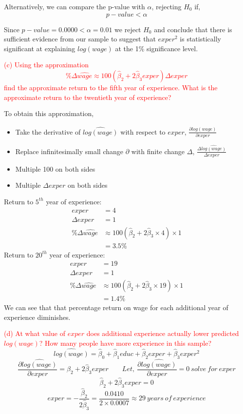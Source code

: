\documentclass[12pt]{report}
\begin{document}
\noindent Alternatively, we can compare the p-value with $\alpha$, rejecting $H_0$ if, $$p-value < \alpha$$

\noindent Since $p-value = 0.0000 < \alpha = 0.01$ we reject $H_0$ and conclude that there is sufficient evidence from our sample to suggest that $exper^2$ is statistically significant at explaining $log(wage)$ at the 1\% significance level.


\newpage
\noindent \textcolor{red}{(c) Using the approximation
	$$\%\Delta\widehat{wage} \approx 100(\hat{\beta}_2 + 2\hat{\beta}_3exper){\Delta}exper$$
	find the approximate return to the fifth year of experience. What is the approximate return to the twentieth year of experience?}

\noindent To obtain this approximation, \begin{itemize}
	\item Take the derivative of $\widehat{log(wage)}$ with respect to $exper$, $\frac{\partial\widehat{log(wage)}}{\partial exper}$
	\item Replace infinitesimally small change $\partial$ with finite change $\Delta$, $\frac{\Delta \widehat{log(wage)}}{\Delta exper}$
	\item Multiple 100 on both sides
	\item Multiple $\Delta exper$ on both sides
\end{itemize}

\noindent Return to $5^{th}$ year of experience:
\begin{align*}	
exper &= 4 \\
{\Delta}exper &= 1 \\
\%\Delta\widehat{wage} &\approx 100(\hat{\beta}_2 + 2\hat{\beta}_3 \times 4)\times 1 \\
&= 3.5\%
\end{align*}
\noindent Return to $20^{th}$ year of experience:
\begin{align*}	
exper &= 19 \\
{\Delta}exper &= 1 \\
\%\Delta\widehat{wage} &\approx 100(\hat{\beta}_2 + 2\hat{\beta}_3 \times 19)\times 1 \\
&= 1.4\%
\end{align*}
\noindent We can see that that percentage return on wage for each additional year of experience diminishes.

\noindent \textcolor{red}{(d) At what value of $exper$ does additional experience actually lower predicted $log(wage)$? How many people have more experience in this sample?}
$$\widehat{log(wage)} = \hat{\beta}_0 + \hat{\beta}_1educ + \hat{\beta}_2exper + \hat{\beta}_3exper^2 $$
$$\dfrac{\partial\widehat{log(wage)}}{{\partial}exper} = \hat{\beta}_2 + 2\hat{\beta}_3exper \qquad Let,\ \dfrac{\partial\widehat{log(wage)}}{{\partial}exper} = 0\ solve\ for\ exper$$
$$\hat{\beta}_2 + 2\hat{\beta}_3exper = 0 $$
$$exper =  -\dfrac{\hat{\beta}_2}{2\hat{\beta}_3} = \dfrac{0.0410}{2\times0.0007} \approx 29\ years\ of\ experience$$
\end{document}
